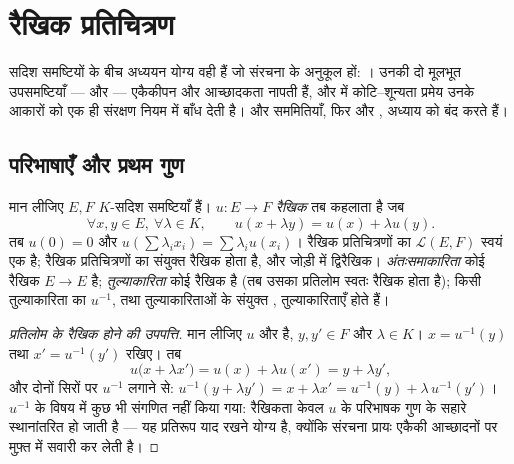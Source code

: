 \chapter{रैखिक प्रतिचित्रण}\label{ch:b1:linmaps}

सदिश समष्टियों के बीच अध्ययन योग्य  वही हैं जो संरचना के अनुकूल
हों: \emph{}। उनकी दो मूलभूत उपसमष्टियाँ ---  और
 --- एकैकीपन और आच्छादकता नापती हैं, और  में
कोटि--शून्यता प्रमेय उनके आकारों को एक ही संरक्षण नियम में बाँध देती है।
 और सममितियाँ, फिर  और , अध्याय को बंद करते हैं।

\section{परिभाषाएँ और प्रथम गुण}

\begin{definition}\label{def:b1:linmaps:def}
मान लीजिए $E, F$ $K$-सदिश समष्टियाँ हैं।  $u \colon E \to F$
\emph{रैखिक} तब कहलाता है जब
\[
\forall x, y \in E,\ \forall \lambda \in K, \qquad
u(x + \lambda y) = u(x) + \lambda u(y).
\]
तब $u(0) = 0$ और $u(\sum \lambda_i x_i) = \sum \lambda_i u(x_i)$। रैखिक
प्रतिचित्रणों का  $\mathcal{L}(E, F)$ स्वयं एक  है; रैखिक
प्रतिचित्रणों का संयुक्त  रैखिक होता है, और जोड़ी में द्विरैखिक।
\emph{अंतःसमाकारिता} कोई रैखिक $E \to E$ है; \emph{तुल्याकारिता} कोई  रैखिक  है (तब उसका प्रतिलोम स्वतः रैखिक होता है); किसी
तुल्याकारिता का $u^{-1}$, तथा तुल्याकारिताओं के संयुक्त ,
तुल्याकारिताएँ होते हैं।
\end{definition}

\begin{proof}[प्रतिलोम के रैखिक होने की उपपत्ति]
मान लीजिए $u$  और  है, $y, y' \in F$ और $\lambda \in K$।
$x = u^{-1}(y)$ तथा $x' = u^{-1}(y')$ रखिए। तब
\[
u\bigl(x + \lambda x'\bigr) = u(x) + \lambda u(x')
= y + \lambda y' ,
\]
और दोनों सिरों पर $u^{-1}$ लगाने से: $u^{-1}(y + \lambda y') = x + \lambda
x' = u^{-1}(y) + \lambda\,u^{-1}(y')$। $u^{-1}$ के विषय में कुछ भी संगणित
नहीं किया गया: रैखिकता केवल $u$ के परिभाषक गुण के सहारे स्थानांतरित हो जाती
है --- यह प्रतिरूप याद रखने योग्य है, क्योंकि संरचना प्रायः एकैकी आच्छादनों
पर मुफ़्त में सवारी कर लेती है।
\end{proof}

